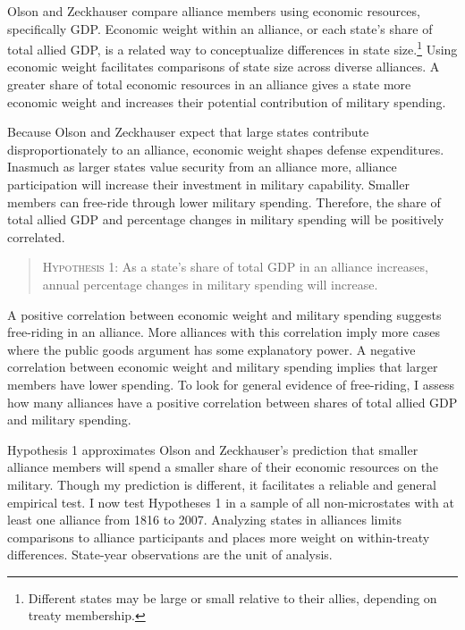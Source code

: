 \documentclass[12pt]{article}
\begin{document}
Olson and Zeckhauser compare alliance members using economic resources, specifically GDP.
Economic weight within an alliance, or each state's share of total allied GDP, is a related way to conceptualize differences in state size.\footnote{Different states may be large or small relative to their allies, depending on treaty membership.} 
Using economic weight facilitates comparisons of state size across diverse alliances. 
A greater share of total economic resources in an alliance gives a state more economic weight and increases their potential contribution of military spending. 


Because Olson and Zeckhauser expect that large states contribute disproportionately to an alliance, economic weight shapes defense expenditures. 
Inasmuch as larger states value security from an alliance more, alliance participation will increase their investment in military capability.
Smaller members can free-ride through lower military spending. 
Therefore, the share of total allied GDP and percentage changes in military spending will be positively correlated. 


\begin{quote}
\textsc{Hypothesis 1}: As a state's share of total GDP in an alliance increases, annual percentage changes in military spending will increase. 
\end{quote}


A positive correlation between economic weight and military spending suggests free-riding in an alliance. 
More alliances with this correlation imply more cases where the public goods argument has some explanatory power. 
A negative correlation between economic weight and military spending implies that larger members have lower spending. 
To look for general evidence of free-riding, I assess how many alliances have a positive correlation between shares of total allied GDP and military spending.  
 

Hypothesis 1 approximates Olson and Zeckhauser's prediction that smaller alliance members will spend a smaller share of their economic resources on the military. 
Though my prediction is different, it facilitates a reliable and general empirical test.
I now test Hypotheses 1 in a sample of all non-microstates with at least one alliance from 1816 to 2007.
Analyzing states in alliances limits comparisons to alliance participants and places more weight on within-treaty differences. 
State-year observations are the unit of analysis.
\end{document}
